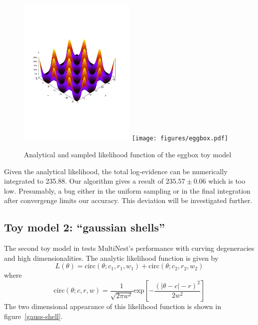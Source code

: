 \documentclass{article}
\begin{document}
\begin{figure}\label{eggbox}
\includegraphics[width=0.5\textwidth]{figures/eggbox_analytic.pdf}
\texttt{[image: figures/eggbox.pdf]}
\caption{Analytical and sampled likelihood function of the eggbox toy model}
\end{figure}

Given the analytical likelihood, the total log-evidence can be numerically integrated to 235.88. Our algorithm gives a result of $235.57\pm 0.06$ which is too low. Presumably, a bug either in the uniform sampling or in the final integration after convergenge limits our accuracy. This deviation will be investigated further.

\subsection{Toy model 2: ``gaussian shells''}
The second toy model in \cite{2009MNRAS.398.1601F} tests MultiNest's performance with curving degeneracies and high dimensionalities. The analytic likelihood function is given by
\[L(\theta) = \mathrm{circ}(\theta;c_1,r_1,w_1)+\mathrm{circ}(\theta;c_2,r_2,w_2)\]
where
\[ \mathrm{circ}(\theta;c,r,w) = \frac{1}{\sqrt{2\pi w^2}}\mathrm{exp}\left[-\frac{(|\theta - c|-r)^2}{2w^2}\right]\]
The two dimensional appearance of this likelihood function is shown in figure~\ref{gauss-shell}.
\end{document}
